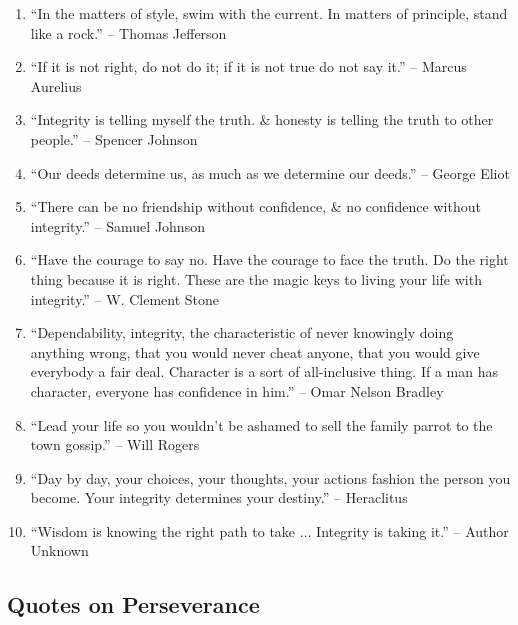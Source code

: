 \documentclass{article}
\begin{document}
\begin{enumerate}
	\item ``In the matters of style, swim with the current. In matters of principle, stand like a rock.'' -- Thomas Jefferson
	\item ``If it is not right, do not do it; if it is not true do not say it.'' -- Marcus Aurelius
	\item ``Integrity is telling myself the truth. \& honesty is telling the truth to other people.'' -- Spencer Johnson
	\item ``Our deeds determine us, as much as we determine our deeds.'' -- George Eliot
	\item ``There can be no friendship without confidence, \& no confidence without integrity.'' -- Samuel Johnson
	\item ``Have the courage to say no. Have the courage to face the truth. Do the right thing because it is right. These are the magic keys to living your life with integrity.'' -- W. Clement Stone
	\item ``Dependability, integrity, the characteristic of never knowingly doing anything wrong, that you would never cheat anyone, that you would give everybody a fair deal. Character is a sort of all-inclusive thing. If a man has character, everyone has confidence in him.'' -- Omar Nelson Bradley
	\item ``Lead your life so you wouldn't be ashamed to sell the family parrot to the town gossip.'' -- Will Rogers
	\item ``Day by day, your choices, your thoughts, your actions fashion the person you become. Your integrity determines your destiny.'' -- Heraclitus
	\item ``Wisdom is knowing the right path to take $\ldots$ Integrity is taking it.'' -- Author Unknown
\end{enumerate}

\subsection{Quotes on Perseverance}
\end{document}

